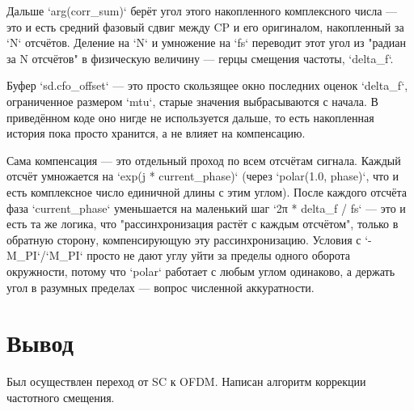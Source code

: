 Дальше `arg(corr\_sum)` берёт угол этого накопленного комплексного числа — это и есть средний фазовый сдвиг между CP и его оригиналом, накопленный за `N` отсчётов. Деление на `N` и умножение на `fs` переводит этот угол из "радиан за N отсчётов" в физическую величину — герцы смещения частоты, `delta\_f`.

Буфер `sd.cfo\_offset` — это просто скользящее окно последних оценок `delta\_f`, ограниченное размером `mtu`, старые значения выбрасываются с начала. В приведённом коде оно нигде не используется дальше, то есть накопленная история пока просто хранится, а не влияет на компенсацию.

Сама компенсация — это отдельный проход по всем отсчётам сигнала. Каждый отсчёт умножается на `exp(j * current\_phase)` (через `polar(1.0, phase)`, что и есть комплексное число единичной длины с этим углом). После каждого отсчёта фаза `current\_phase` уменьшается на маленький шаг `2π * delta\_f / fs` — это и есть та же логика, что "рассинхронизация растёт с каждым отсчётом", только в обратную сторону, компенсирующую эту рассинхронизацию. Условия с `-M\_PI`/`M\_PI` просто не дают углу уйти за пределы одного оборота окружности, потому что `polar` работает с любым углом одинаково, а держать угол в разумных пределах — вопрос численной аккуратности.

\section*{Вывод}
Был осуществлен переход от SC к OFDM. Написан алгоритм коррекции частотного смещения.
